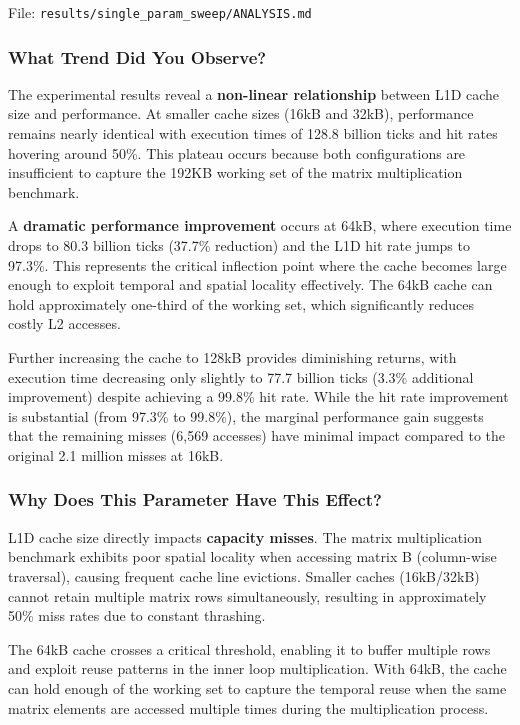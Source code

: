 \documentclass[11pt,a4paper]{article}
\begin{document}
File: \texttt{results/single\_param\_sweep/ANALYSIS.md}

\subsubsection{What Trend Did You Observe?}

The experimental results reveal a \textbf{non-linear relationship} between L1D cache size and performance. At smaller cache sizes (16kB and 32kB), performance remains nearly identical with execution times of 128.8 billion ticks and hit rates hovering around 50\%. This plateau occurs because both configurations are insufficient to capture the 192KB working set of the matrix multiplication benchmark.

A \textbf{dramatic performance improvement} occurs at 64kB, where execution time drops to 80.3 billion ticks (37.7\% reduction) and the L1D hit rate jumps to 97.3\%. This represents the critical inflection point where the cache becomes large enough to exploit temporal and spatial locality effectively. The 64kB cache can hold approximately one-third of the working set, which significantly reduces costly L2 accesses.

Further increasing the cache to 128kB provides diminishing returns, with execution time decreasing only slightly to 77.7 billion ticks (3.3\% additional improvement) despite achieving a 99.8\% hit rate. While the hit rate improvement is substantial (from 97.3\% to 99.8\%), the marginal performance gain suggests that the remaining misses (6,569 accesses) have minimal impact compared to the original 2.1 million misses at 16kB.

\subsubsection{Why Does This Parameter Have This Effect?}

L1D cache size directly impacts \textbf{capacity misses}. The matrix multiplication benchmark exhibits poor spatial locality when accessing matrix B (column-wise traversal), causing frequent cache line evictions. Smaller caches (16kB/32kB) cannot retain multiple matrix rows simultaneously, resulting in approximately 50\% miss rates due to constant thrashing.

The 64kB cache crosses a critical threshold, enabling it to buffer multiple rows and exploit reuse patterns in the inner loop multiplication. With 64kB, the cache can hold enough of the working set to capture the temporal reuse when the same matrix elements are accessed multiple times during the multiplication process.
\end{document}
